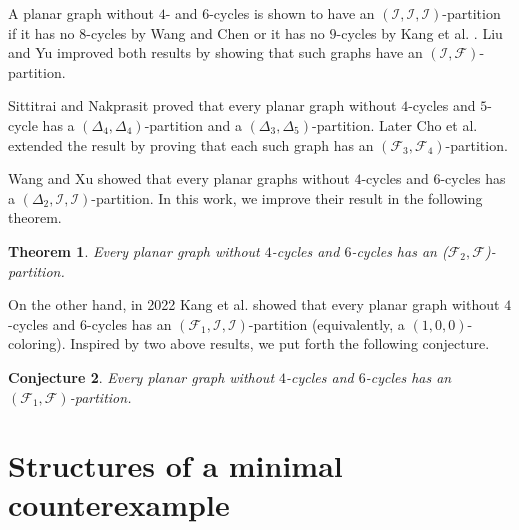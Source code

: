 \documentclass[11pt]{amsart} %
\newtheorem{theorem}{Theorem}[section]
\newtheorem{conjecture}[theorem]{Conjecture}
\theoremstyle{definition}
\begin{document}
A planar graph without $4$- and $6$-cycles is shown to have 
an $(\mathcal{I},\mathcal{I},\mathcal{I})$-partition 
if it has no $8$-cycles by Wang and Chen \cite{000C4C6C8}  
or it has no $9$-cycles by Kang et al. \cite{000C4C6C9}. 
Liu and Yu \cite{1FC4C6C8C9} improved both results by showing 
that such graphs have an  $(\mathcal{I},\mathcal{F})$-partition. 

Sittitrai and Nakprasit \cite{35o44C4C5} proved that 
every planar graph without $4$-cycles and $5$-cycle has 
a $(\Delta_4,\Delta_4)$-partition and a $(\Delta_3,\Delta_5)$-partition. 
Later Cho et al. \cite{F34C45}  extended the result by proving that 
each such graph has an $(\mathcal{F}_3,\mathcal{F}_4)$-partition.
 
Wang and Xu \cite{200C4C6} showed that every planar graphs without 
$4$-cycles and $6$-cycles has a $(\Delta_2,\mathcal{I},\mathcal{I})$-partition. 
In this work, we improve their result in the following theorem.  
 
 
 \begin{theorem}\label{main}
 	Every planar graph without $4$-cycles and $6$-cycles has 
 	an ($\mathcal{F}_2,\mathcal{F}$)-partition.
 \end{theorem} 
 
On the other hand, in 2022 Kang et al. \cite{100C4C6} showed that 
every planar graph without $4$-cycles and $6$-cycles has 
an $(\mathcal{F}_1,\mathcal{I},\mathcal{I})$-partition 
(equivalently, a $(1,0,0)$-coloring). 
Inspired by two above results, we put forth the following conjecture.    
\begin{conjecture} 	Every planar graph without $4$-cycles and $6$-cycles 
has an $(\mathcal{F}_1,\mathcal{F})$-partition.
\end{conjecture}	


\section{Structures of a minimal counterexample}
\end{document}

